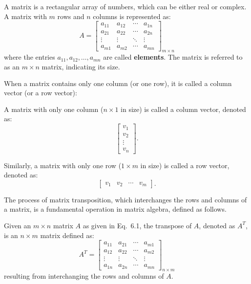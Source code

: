 \documentclass[12pt]{article}
\begin{document}
\begin{definition}[Matrix]
    A matrix is a rectangular array of numbers, which can be either real or complex. A matrix with $m$ rows and $n$ columns is represented as:
    \[
    A = \begin{bmatrix}
    a_{11} & a_{12} & \cdots & a_{1n} \\
    a_{21} & a_{22} & \cdots & a_{2n} \\
    \vdots & \vdots & \ddots & \vdots \\
    a_{m1} & a_{m2} & \cdots & a_{mn}
    \end{bmatrix}_{m \times n}
    \]
    where the entries $a_{11}, a_{12}, \ldots, a_{mn}$ are called \textbf{elements}. The matrix is referred to as an $m \times n$ matrix, indicating its size.
\end{definition}

When a matrix contains only one column (or one row), it is called a column vector (or a row vector):

\begin{definition}
    A matrix with only one column ($n \times 1$ in size) is called a column vector, denoted as:
    \[
    \begin{bmatrix}
    v_1 \\
    v_2 \\
    \vdots \\
    v_n
    \end{bmatrix} .
    \]

    Similarly, a matrix with only one row ($1 \times m$ in size) is called a row vector, denoted as:
    \[
    \begin{bmatrix}
    v_1 & v_2 & \cdots & v_m
    \end{bmatrix} .
    \]
\end{definition}

The process of matrix transposition, which interchanges the rows and columns of a matrix, is a fundamental operation in matrix algebra, defined as follows.

\begin{definition}[Transpose]
    Given an $m \times n$ matrix $A$ as given in Eq.~6.1, the transpose of $A$, denoted as $A^T$, is an $n \times m$ matrix defined as:
    \[
    A^T = \begin{bmatrix}
    a_{11} & a_{21} & \cdots & a_{m1} \\
    a_{12} & a_{22} & \cdots & a_{m2} \\
    \vdots & \vdots & \ddots & \vdots \\
    a_{1n} & a_{2n} & \cdots & a_{mn}
    \end{bmatrix}_{n \times m}
    \]
    resulting from interchanging the rows and columns of $A$.
\end{definition}
\end{document}
